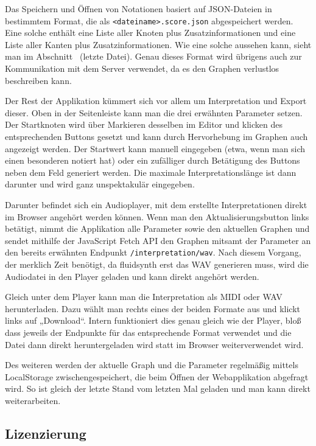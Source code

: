 \documentclass[a4paper,twocolumn]{article}
\begin{document}
Das Speichern und Öffnen von Notationen basiert auf JSON-Dateien
\cite{json} in bestimmtem Format, die als
\lstinline|<dateiname>.score.json| abgespeichert werden.
Eine solche enthält eine Liste aller Knoten plus Zusatzinformationen und eine
Liste aller Kanten plus Zusatzinformationen. Wie eine solche aussehen kann,
sieht man im Abschnitt~ (letzte Datei). Genau dieses Format
wird übrigens auch zur Kommunikation mit dem Server verwendet, da es den Graphen
verlustlos beschreiben kann.

Der Rest der Applikation kümmert sich vor allem um Interpretation und Export
dieser. Oben in der Seitenleiste kann man die drei erwähnten Parameter setzen.
Der Startknoten wird über Markieren desselben im Editor und klicken des
entsprechenden Buttons gesetzt und kann durch Hervorhebung im Graphen auch
angezeigt werden. Der Startwert kann manuell eingegeben (etwa, wenn man
sich einen besonderen notiert hat) oder ein zufälliger durch Betätigung des
Buttons neben dem Feld generiert werden. Die maximale Interpretationslänge ist
dann darunter und wird ganz unspektakulär eingegeben.

Darunter befindet sich ein Audioplayer, mit dem erstellte Interpretationen
direkt im Browser angehört werden können. Wenn man den Aktualisierungsbutton
links betätigt, nimmt die Applikation alle Parameter sowie den aktuellen Graphen
und sendet mithilfe der JavaScript Fetch API \cite{fetch_api} den Graphen
mitsamt der Parameter an den bereits erwähnten Endpunkt
\lstinline|/interpretation/wav|. Nach diesem Vorgang, der merklich Zeit benötigt,
da fluidsynth \cite{fluidsynth} erst das WAV generieren muss, wird die
Audiodatei in den Player geladen und kann direkt angehört werden.

Gleich unter dem Player kann man die Interpretation als MIDI oder WAV
herunterladen. Dazu wählt man rechts eines der beiden Formate aus und klickt
links auf „Download“. Intern funktioniert dies genau gleich wie der Player, bloß
dass jeweils der Endpunkte für das entsprechende Format verwendet und
die Datei dann direkt heruntergeladen wird statt im Browser weiterverwendet
wird.

Des weiteren werden der aktuelle Graph und die Parameter regelmäßig mittels
LocalStorage \cite{localstorage} zwischengespeichert, die beim Öffnen der
Webapplikation abgefragt wird. So ist gleich der letzte Stand vom letzten Mal
geladen und man kann direkt weiterarbeiten.

\subsection*{Lizenzierung}
\end{document}
